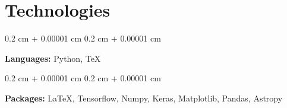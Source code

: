 \documentclass[10pt, letterpaper]{article}
\newenvironment{onecolentry}{
    \begin{adjustwidth}{
        0.2 cm + 0.00001 cm
    }{
        0.2 cm + 0.00001 cm
    }
}{
    \end{adjustwidth}
} %
\begin{document}
         



    
    \section{Technologies}



        
        \begin{onecolentry}
            \textbf{Languages:} Python, \TeX
        \end{onecolentry}

        \vspace{0.2 cm}

        \begin{onecolentry}
            \textbf{Packages:} \LaTeX, Tensorflow, Numpy, Keras, Matplotlib, Pandas, Astropy
        \end{onecolentry}

    




    
\end{document}

